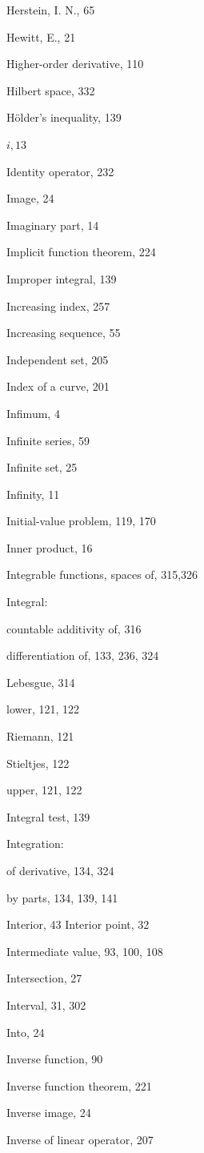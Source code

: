 \documentclass[10pt]{article}
\begin{document}
Herstein, I. N., 65

Hewitt, E., 21

Higher-order derivative, 110

Hilbert space, 332

Hölder's inequality, 139

$i, 13$

Identity operator, 232

Image, 24

Imaginary part, 14

Implicit function theorem, 224

Improper integral, 139

Increasing index, 257

Increasing sequence, 55

Independent set, 205

Index of a curve, 201

Infimum, 4

Infinite series, 59

Infinite set, 25

Infinity, 11

Initial-value problem, 119, 170

Inner product, 16

Integrable functions, spaces of, 315,326

Integral:

countable additivity of, 316

differentiation of, 133, 236, 324

Lebesgue, 314

lower, 121, 122

Riemann, 121

Stieltjes, 122

upper, 121, 122

Integral test, 139

Integration:

of derivative, 134, 324

by parts, 134, 139, 141

Interior, 43 Interior point, 32

Intermediate value, 93, 100, 108

Intersection, 27

Interval, 31, 302

Into, 24

Inverse function, 90

Inverse function theorem, 221

Inverse image, 24

Inverse of linear operator, 207
\end{document}
